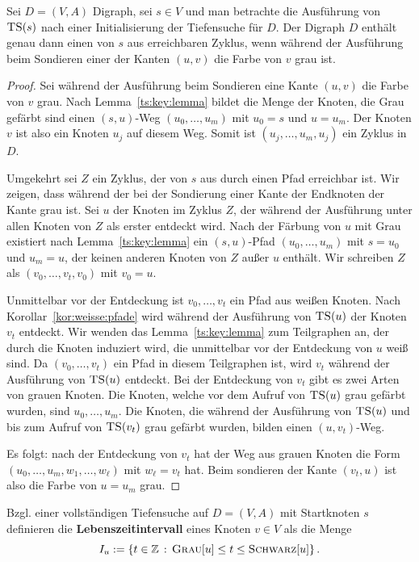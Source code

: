 \begin{thm} \label{thm:ts:und:zyklen} 
	Sei $D=(V,A)$ Digraph, sei $s \in V$ und man betrachte die Ausführung von $\mathop{\text{\textsc{TS}}}(s)$ nach einer Initialisierung der Tiefensuche für $D$. Der Digraph $D$ enthält genau dann einen von $s$ aus erreichbaren Zyklus, wenn während der Ausführung beim Sondieren einer der Kanten $(u,v)$ die Farbe von $v$ grau ist. 
\end{thm}
\begin{proof}	
	Sei während der Ausführung beim Sondieren eine Kante $(u,v)$ die Farbe von $v$ grau. Nach Lemma~\ref{ts:key:lemma} bildet die Menge der Knoten, die Grau gefärbt sind einen $(s,u)$-Weg $(u_0,\ldots,u_m)$ mit $u_0=s$ und $u=u_m$. Der Knoten $v$ ist also ein Knoten $u_j$ auf diesem Weg. Somit ist $(u_j,\ldots,u_m,u_j)$ ein Zyklus in $D$. 
	
	Umgekehrt sei $Z$ ein Zyklus, der von $s$ aus durch einen Pfad erreichbar ist. Wir zeigen, dass während der bei der Sondierung einer Kante der Endknoten der Kante grau ist. Sei $u$ der Knoten im Zyklus $Z$, der während der Ausführung unter allen Knoten von $Z$ als erster entdeckt wird. Nach der Färbung von $u$ mit Grau existiert nach Lemma~\ref{ts:key:lemma} ein $(s,u)$-Pfad $(u_0,\ldots,u_m)$ mit $s=u_0$ und $u_m=u$, der keinen anderen Knoten von $Z$ außer $u$ enthält. Wir schreiben $Z$ als $(v_0,\ldots,v_t,v_0)$ mit $v_0=u$.  
	
	Unmittelbar vor der Entdeckung ist $v_0,\ldots,v_t$ ein Pfad aus weißen Knoten. Nach Korollar~\ref{kor:weisse:pfade} wird während der Ausführung von $\mathop{\text{\textsc{TS}}}(u)$ der Knoten $v_t$ entdeckt. Wir wenden das Lemma~\ref{ts:key:lemma} zum Teilgraphen an, der durch die Knoten induziert wird, die unmittelbar vor der Entdeckung von $u$ weiß sind. Da  $(v_0,\ldots,v_t)$ ein Pfad in diesem Teilgraphen ist, wird $v_t$ während der Ausführung von $\mathop{\text{\textsc{TS}}}(u)$ entdeckt. Bei der Entdeckung von $v_t$ gibt es zwei Arten von grauen Knoten.  Die Knoten, welche vor dem Aufruf von $\mathop{\text{\textsc{TS}}}(u)$ grau gefärbt wurden, sind $u_0,\ldots,u_m$. Die Knoten, die während der Ausführung von $\mathop{\text{\textsc{TS}}}(u)$ und bis zum Aufruf von $\mathop{\text{\textsc{TS}}}(v_t)$ grau gefärbt wurden, bilden einen $(u,v_t)$-Weg. 
	
	Es folgt:  nach der Entdeckung von $v_t$ hat der Weg aus grauen Knoten die Form $(u_0,\ldots,u_m, w_1,\ldots,w_\ell)$ mit $w_\ell =v_t$ hat. Beim sondieren der Kante $(v_t,u)$ ist also die Farbe von $u=u_m$ grau. 
\end{proof}

\begin{defn}
	Bzgl. einer vollständigen Tiefensuche auf $D=(V,A)$ mit Startknoten $s$ definieren die \textbf{Lebenszeitintervall} eines Knoten $v \in V$ als die Menge
	\[
			I_u:=\left\{ t \in \mathbb{Z} \,:\,  \mathop{\text{\textsc{Grau}}}[u] \le t \le \mathop{\text{\textsc{Schwarz}}}[u] \right\}. 
	\]
\end{defn} 


